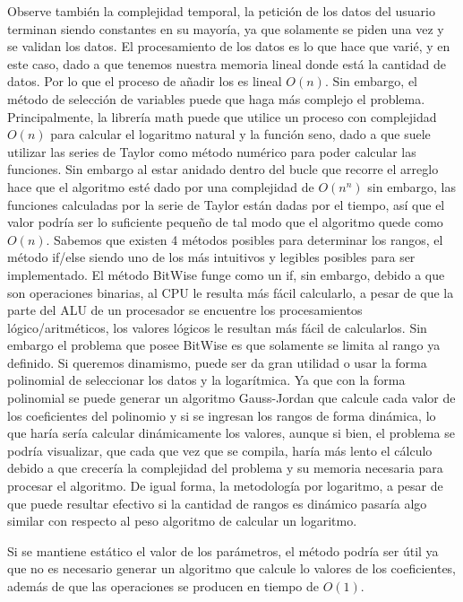 \documentclass{article}
\begin{document}
Observe también la complejidad temporal, la petición de los datos del usuario terminan siendo constantes en su mayoría, ya que solamente se piden una vez y se validan los datos.
El procesamiento de los datos es lo que hace que varié, y en este caso, dado a que tenemos nuestra memoria lineal donde está la cantidad de datos. Por lo que el proceso de añadir los es lineal $O(n)$. 
Sin embargo, el método de selección de variables puede que haga más complejo el problema.
Principalmente, la librería math puede que utilice un proceso con complejidad $O(n)$ para calcular el logaritmo natural y la función seno, dado a que suele utilizar las series de Taylor como método numérico para poder  calcular las funciones. Sin embargo al estar anidado dentro del bucle que recorre el arreglo hace que el algoritmo esté dado por una complejidad de $O(n^n)$ sin embargo, las funciones calculadas por la serie de Taylor están dadas por el tiempo, así que el valor podría ser lo suficiente pequeño de tal modo que el algoritmo quede como $O(n)$. 
Sabemos que existen 4 métodos posibles para determinar los rangos, el método if/else siendo uno de los más intuitivos y legibles posibles para ser implementado. El método BitWise funge como un if, sin embargo, debido a que son operaciones binarias, al CPU le resulta más fácil calcularlo, a pesar de que la parte del ALU de un procesador se encuentre los procesamientos lógico/aritméticos, los valores lógicos le resultan más fácil de calcularlos. Sin embargo el problema que posee BitWise es que solamente se limita al rango ya definido. Si queremos dinamismo, puede ser da gran utilidad o usar la forma polinomial de seleccionar los datos y la logarítmica. Ya que con la forma polinomial se puede generar un algoritmo Gauss-Jordan que calcule cada valor de los coeficientes del polinomio y si se ingresan los rangos de forma dinámica, lo que haría sería calcular dinámicamente los valores, aunque si bien, el problema se podría visualizar, que cada que vez que se compila, haría más lento el cálculo debido a que crecería la complejidad del problema y su memoria necesaria para procesar el algoritmo.
De igual forma, la metodología por logaritmo, a pesar de que puede resultar efectivo si la cantidad de rangos es dinámico pasaría algo similar con respecto al peso algoritmo de calcular un logaritmo.

Si se mantiene estático el valor de los parámetros, el método podría ser útil ya que no es necesario generar un algoritmo que calcule lo valores de los coeficientes, además de que las operaciones se producen en tiempo de $O(1)$.
\end{document}
